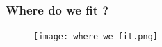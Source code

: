 \documentclass[mathserif, aspectratio=169]{beamer}
\newcommand{\vect}[1]{\boldsymbol{#1}}
\begin{document}

\begin{frame}
	\frametitle{Where do we fit ?}
	\begin{figure}
		\centering
		\texttt{[image: where\_we\_fit.png]}
	\end{figure}
\end{frame}

\end{document}
